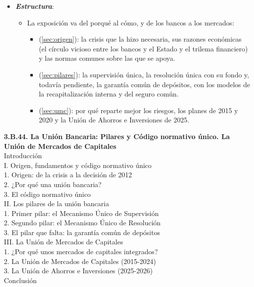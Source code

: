 \documentclass[11pt]{article}
\begin{document}
\begin{itemize}
\item \textbf{\emph{Estructura}}:
  \begin{itemize}
  \item La exposición va del porqué al cómo, y de los bancos a los mercados:
    \begin{itemize}
    \item {} (\ref{sec:origen}): la crisis que la hizo necesaria, sus razones económicas (el círculo vicioso entre los bancos y el Estado y el trilema financiero) y las normas comunes sobre las que se apoya.
    \item {} (\ref{sec:pilares}): la supervisión única, la resolución única con su fondo y, todavía pendiente, la garantía común de depósitos, con los modelos de la recapitalización interna y del seguro común.
    \item {} (\ref{sec:umc}): por qué reparte mejor los riesgos, los planes de 2015 y 2020 y la Unión de Ahorros e Inversiones de 2025.
    \end{itemize}
  \end{itemize}
\end{itemize}

\begin{esquema}[unbreakable]
\textbf{3.B.44. La Unión Bancaria: Pilares y Código normativo único. La Unión de Mercados de Capitales}\\[2pt]
Introducción\\
I. Origen, fundamentos y código normativo único\\
\hspace*{1.5em}1. Origen: de la crisis a la decisión de 2012\\
\hspace*{1.5em}2. ¿Por qué una unión bancaria?\\
\hspace*{1.5em}3. El código normativo único\\
II. Los pilares de la unión bancaria\\
\hspace*{1.5em}1. Primer pilar: el Mecanismo Único de Supervisión\\
\hspace*{1.5em}2. Segundo pilar: el Mecanismo Único de Resolución\\
\hspace*{1.5em}3. El pilar que falta: la garantía común de depósitos\\
III. La Unión de Mercados de Capitales\\
\hspace*{1.5em}1. ¿Por qué unos mercados de capitales integrados?\\
\hspace*{1.5em}2. La Unión de Mercados de Capitales (2015-2024)\\
\hspace*{1.5em}3. La Unión de Ahorros e Inversiones (2025-2026)\\
Conclusión
\end{esquema}
\end{document}
